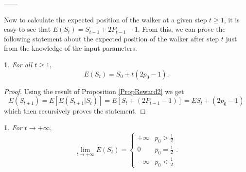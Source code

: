\documentclass{amsart}
\theoremstyle{definition}
\theoremstyle{plain}
\newtheorem{prop}[thm]{\protect\propositionname}
\theoremstyle{plain}
\newtheorem{cor}[thm]{\protect\corollaryname}
\theoremstyle{plain}
\numberwithin{equation}{section}
\providecommand{\corollaryname}{Corollary}
\providecommand{\propositionname}{Proposition}
\begin{document}
------

Now to calculate the expected position of the walker at a given
step $t\geq1$, it is easy to see that
$E(S_{t})=S_{t-1}+2P_{t-1}-1$. From this, we can prove the
following statement about the expected position of the walker
after step $t$ just from the knowledge of the input parameters.

\begin{prop}
For all $t\geq1,$
\[
E(S_{t})=S_{0}+t(2p_{0}-1).
\]
\end{prop}
\begin{proof}
Using the result of Proposition \ref{PropReward2} we get
\[
E(S_{t+1})=E[E(S_{t+1}|S_{t})]=E[S_{t}+(2P_{t-1}-1)]=
ES_{t}+(2p_{0}-1)
\]
which then recursively proves the statement.
\end{proof}

\begin{cor}
For $t\rightarrow+\infty,$ \textup{
\[
\lim_{t\to+\infty}E(S_{t})=\begin{cases}
+\infty & p_{0}>\frac{1}{2}\\
0 & p_{0}=\frac{1}{2}\\
-\infty & p_{0}<\frac{1}{2}
\end{cases}.
\]
}
\end{cor}
\end{document}

